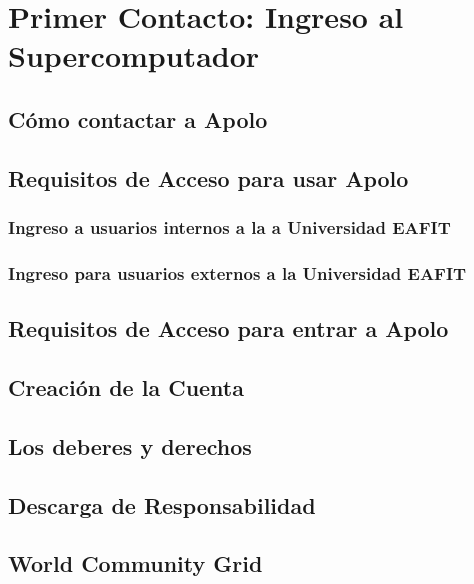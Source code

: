 \section{Primer Contacto: Ingreso al Supercomputador}
\subsection{Cómo contactar a Apolo}
\subsection{Requisitos de Acceso para usar Apolo}
\subsubsection{Ingreso a usuarios internos a la a Universidad EAFIT}
\subsubsection{Ingreso para usuarios externos a la Universidad EAFIT}
\subsection{Requisitos de Acceso para entrar a Apolo} 
\subsection{Creación de la Cuenta}
\subsection{Los deberes y derechos}
\subsection{Descarga de Responsabilidad}
\subsection{World Community Grid}